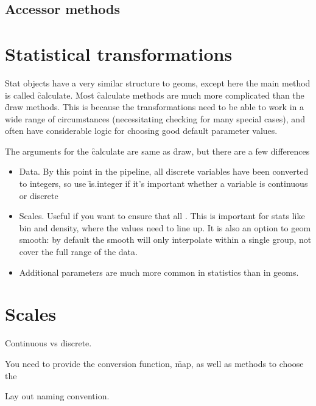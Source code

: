 \subsection{Accessor methods}



\section{Statistical transformations}
\label{sec:own-stat}

Stat objects have a very similar structure to geoms, except here the main method is called \f{calculate}.  Most \f{calculate} methods are much more complicated than the \f{draw} methods.  This is because the transformations need to be able to work in a wide range of circumstances (necessitating checking for many special cases), and often have considerable logic for choosing good default parameter values.

The arguments for the \f{calculate} are same as \f{draw}, but there are a few differences

\begin{itemize}
  \item Data. By this point in the pipeline, all discrete variables have been converted to integers, so use \f{is.integer} if it's important whether a variable is continuous or discrete
  
  \item Scales.  Useful if you want to ensure that all .  This is important for stats like bin and density, where the values need to line up.  It is also an option to geom smooth: by default the smooth will only interpolate within a single group, not cover the full range of the data.

  \item Additional parameters are much more common in statistics than in geoms.
\end{itemize}

\section{Scales}
\label{sec:own-scale}

Continuous vs discrete.  

You need to provide the conversion function, \f{map}, as well as methods to choose the 

Lay out naming convention.



